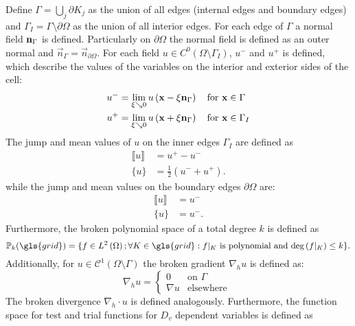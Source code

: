 Define $\Gamma = \bigcup_j \partial K_j$ as the union of all edges (internal edges and boundary edges) and $\Gamma_I = \Gamma \setminus \partial \Omega$ as the union of all interior edges.
For each edge of $\Gamma$ a normal field $\textbf{n}_{\Gamma}$ is defined. Particularly on $\partial \Omega$ the normal field is defined as an outer normal and $\vec{n}_\Gamma = \vec{n}_{\partial\Omega}$.
For each field ${u} \in C^0\left(\Omega\setminus \Gamma_I\right)$, ${u}^-$  and ${u}^+$ is defined, which describe the values of the variables on the interior and exterior sides of the cell:
\begin{align}
	{u}^- & = \lim_{\xi \searrow 0} {u}\left(\textbf{x} - \xi \textbf{n}_{\Gamma}\right) \quad \text{for } \textbf{x}\in \Gamma   \\
	{u}^+ & = \lim_{\xi \searrow 0} {u}\left(\textbf{x} + \xi \textbf{n}_{\Gamma}\right) \quad \text{for } \textbf{x}\in \Gamma_I
\end{align}
The jump and mean values of ${u}$ on the inner edges $\Gamma_I$ are defined as
\begin{align}
	\llbracket {u} \rrbracket & = {u}^+-{u}^-                           \\
	\{{u}\}                   & = \frac{1}{2} \left({u}^-+{u}^+\right).
\end{align}
while the jump and mean values on the boundary edges $\partial \Omega$ are:
\begin{align}
	\llbracket {u} \rrbracket & = {u}^-  \\
	\{{u}\}                   & = {u}^-.
\end{align}
Furthermore, the broken polynomial space of a total degree $k$ is defined as
\begin{equation}
	\mathbb{P}_k(\gls{grid} )= \{f \in L^2\left(\Omega\right); \forall K \in \gls{grid} : f\vert_{K} \text{ is polynomial and deg}\left(f\vert_{K}\right)\leq k \}.
	\label{Eq:PolSpace}
\end{equation}
Additionally, for $u \in \mathcal{C}^1(\Omega \setminus \Gamma)$ the broken gradient $\nabla_h u$ is defined as:
\begin{equation}
	\nabla_h u
	= \begin{cases}
		0
		 & \text{on }\Gamma  \\
		\nabla u
		 & \text{elsewhere }
	\end{cases}
\end{equation}
The broken divergence $\nabla_h \cdot u$ is defined analogously. Furthermore, the function space for test and trial functions for $D_v$ dependent variables is defined as
